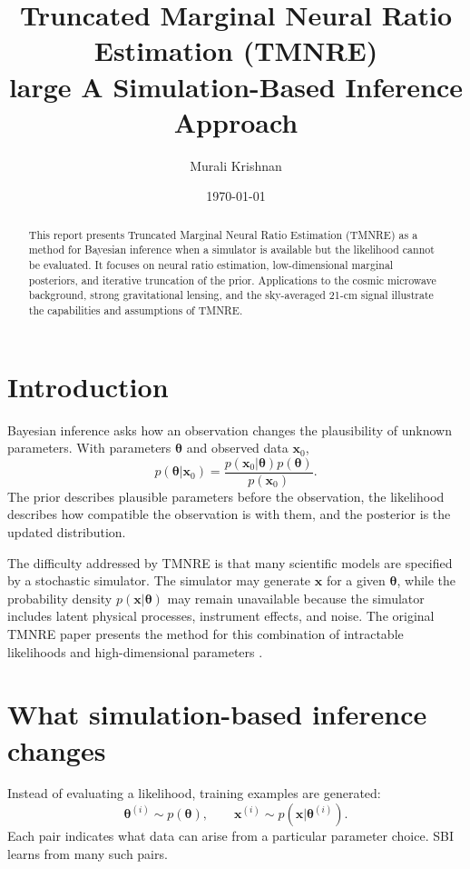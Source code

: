 ﻿\documentclass[11pt,a4paper]{article}
\title{Truncated Marginal Neural Ratio Estimation (TMNRE)\\large A Simulation-Based Inference Approach}
\author{Murali Krishnan}
\date{\today}
\begin{document}
\maketitle

\begin{abstract}
This report presents Truncated Marginal Neural Ratio Estimation (TMNRE) as a method for Bayesian inference when a simulator is available but the likelihood cannot be evaluated. It focuses on neural ratio estimation, low-dimensional marginal posteriors, and iterative truncation of the prior. Applications to the cosmic microwave background, strong gravitational lensing, and the sky-averaged 21-cm signal illustrate the capabilities and assumptions of TMNRE.
\end{abstract}

\section{Introduction}
Bayesian inference asks how an observation changes the plausibility of unknown parameters. With parameters $\bm{\theta}$ and observed data $\bm{x}_0$,
\begin{equation}
p(\bm{\theta}|\bm{x}_0)=\frac{p(\bm{x}_0|\bm{\theta})p(\bm{\theta})}{p(\bm{x}_0)}.
\end{equation}
The prior describes plausible parameters before the observation, the likelihood describes how compatible the observation is with them, and the posterior is the updated distribution.

The difficulty addressed by TMNRE is that many scientific models are specified by a stochastic simulator. The simulator may generate $\bm{x}$ for a given $\bm{\theta}$, while the probability density $p(\bm{x}|\bm{\theta})$ may remain unavailable because the simulator includes latent physical processes, instrument effects, and noise. The original TMNRE paper presents the method for this combination of intractable likelihoods and high-dimensional parameters \citep{tmnreOriginal}.

\section{What simulation-based inference changes}
Instead of evaluating a likelihood, training examples are generated:
\begin{equation}
\bm{\theta}^{(i)}\sim p(\bm{\theta}),\qquad
\bm{x}^{(i)}\sim p(\bm{x}|\bm{\theta}^{(i)}).
\end{equation}
Each pair indicates what data can arise from a particular parameter choice. SBI learns from many such pairs.
\end{document}
